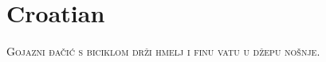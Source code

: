 

\presection\section*{\checkno Croatian}\postsection

\textsc{Gojazni đačić s biciklom drži hmelj i finu vatu u džepu nošnje.}